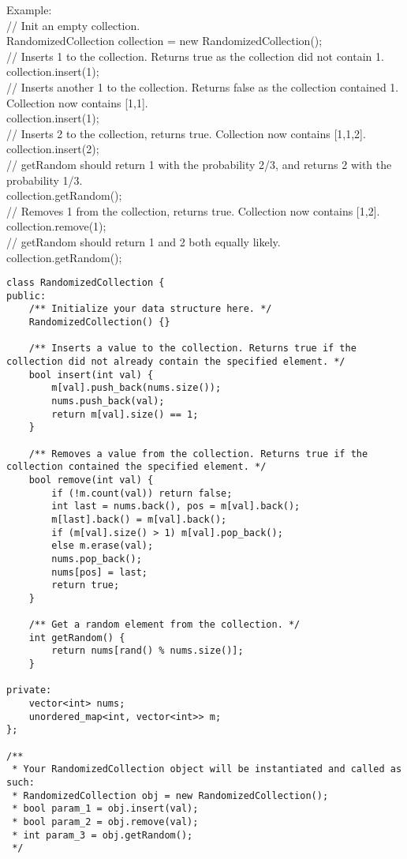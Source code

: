 Example:\\
// Init an empty collection.\\
RandomizedCollection collection = new RandomizedCollection();\\

// Inserts 1 to the collection. Returns true as the collection did not contain 1.\\
collection.insert(1);\\

// Inserts another 1 to the collection. Returns false as the collection contained 1. Collection now contains [1,1].\\
collection.insert(1);\\

// Inserts 2 to the collection, returns true. Collection now contains [1,1,2].\\
collection.insert(2);\\

// getRandom should return 1 with the probability 2/3, and returns 2 with the probability 1/3.\\
collection.getRandom();\\

// Removes 1 from the collection, returns true. Collection now contains [1,2].\\
collection.remove(1);\\

// getRandom should return 1 and 2 both equally likely.\\
collection.getRandom();\\

\begin{lstlisting}
class RandomizedCollection {
public:
    /** Initialize your data structure here. */
    RandomizedCollection() {}
    
    /** Inserts a value to the collection. Returns true if the collection did not already contain the specified element. */
    bool insert(int val) {
        m[val].push_back(nums.size());
        nums.push_back(val);
        return m[val].size() == 1;
    }
    
    /** Removes a value from the collection. Returns true if the collection contained the specified element. */
    bool remove(int val) {
        if (!m.count(val)) return false;
        int last = nums.back(), pos = m[val].back(); 
        m[last].back() = m[val].back();
        if (m[val].size() > 1) m[val].pop_back();
        else m.erase(val);
        nums.pop_back();
        nums[pos] = last;
        return true;
    }
    
    /** Get a random element from the collection. */
    int getRandom() {
        return nums[rand() % nums.size()];
    }
    
private:
    vector<int> nums;
    unordered_map<int, vector<int>> m;
};

/**
 * Your RandomizedCollection object will be instantiated and called as such:
 * RandomizedCollection obj = new RandomizedCollection();
 * bool param_1 = obj.insert(val);
 * bool param_2 = obj.remove(val);
 * int param_3 = obj.getRandom();
 */
\end{lstlisting}


